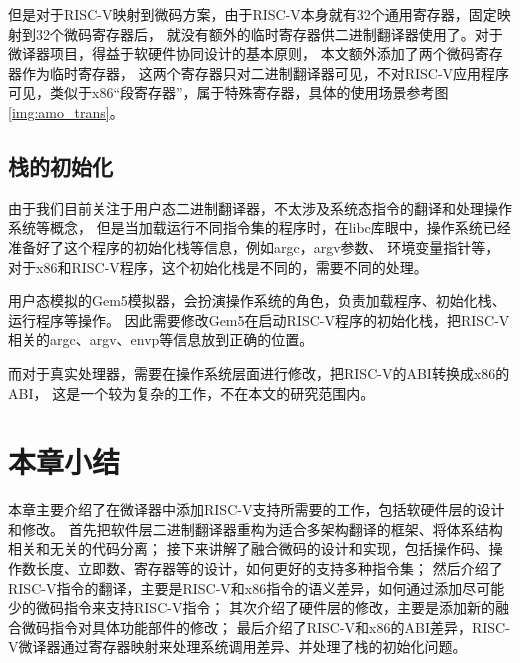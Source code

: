 但是对于RISC-V映射到微码方案，由于RISC-V本身就有32个通用寄存器，固定映射到32个微码寄存器后，
就没有额外的临时寄存器供二进制翻译器使用了。对于微译器项目，得益于软硬件协同设计的基本原则，
本文额外添加了两个微码寄存器作为临时寄存器，
这两个寄存器只对二进制翻译器可见，不对RISC-V应用程序可见，类似于x86“段寄存器”，属于特殊寄存器，具体的使用场景参考图\ref{img:amo_trans}。


\subsection{栈的初始化}
由于我们目前关注于用户态二进制翻译器，不太涉及系统态指令的翻译和处理操作系统等概念，
但是当加载运行不同指令集的程序时，在libc库眼中，操作系统已经准备好了这个程序的初始化栈等信息，例如argc，argv参数、
环境变量指针等，对于x86和RISC-V程序，这个初始化栈是不同的，需要不同的处理。

用户态模拟的Gem5模拟器，会扮演操作系统的角色，负责加载程序、初始化栈、运行程序等操作。
因此需要修改Gem5在启动RISC-V程序的初始化栈，把RISC-V相关的argc、argv、envp等信息放到正确的位置。

而对于真实处理器，需要在操作系统层面进行修改，把RISC-V的ABI转换成x86的ABI，
这是一个较为复杂的工作，不在本文的研究范围内。

\section{本章小结}

本章主要介绍了在微译器中添加RISC-V支持所需要的工作，包括软硬件层的设计和修改。
首先把软件层二进制翻译器重构为适合多架构翻译的框架、将体系结构相关和无关的代码分离；
接下来讲解了融合微码的设计和实现，包括操作码、操作数长度、立即数、寄存器等的设计，如何更好的支持多种指令集；
然后介绍了RISC-V指令的翻译，主要是RISC-V和x86指令的语义差异，如何通过添加尽可能少的微码指令来支持RISC-V指令；
其次介绍了硬件层的修改，主要是添加新的融合微码指令对具体功能部件的修改；
最后介绍了RISC-V和x86的ABI差异，RISC-V微译器通过寄存器映射来处理系统调用差异、并处理了栈的初始化问题。